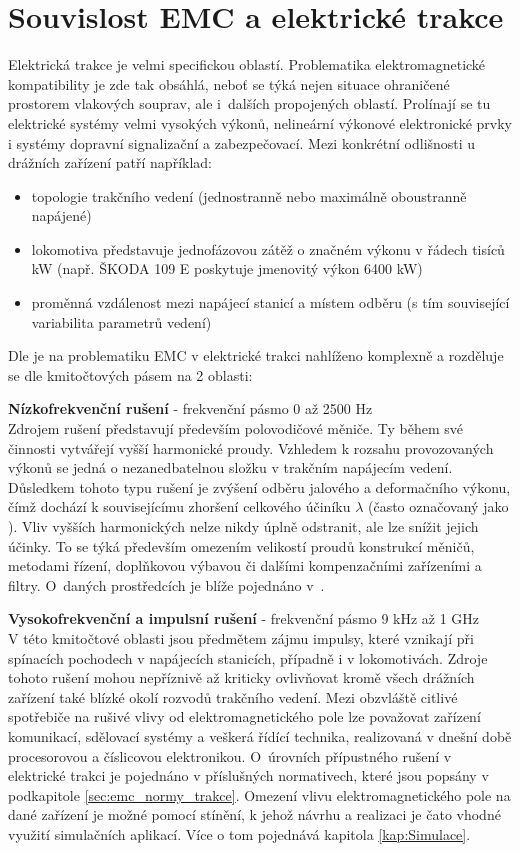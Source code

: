 \section{Souvislost EMC a elektrické trakce} \label{sec:emc_trakce}
Elektrická trakce je velmi specifickou oblastí. Problematika elektromagnetické kompatibility je zde tak obsáhlá, neboť se týká nejen situace ohraničené prostorem vlakových souprav, ale i~dalších propojených oblastí. Prolínají se tu elektrické systémy velmi vysokých výkonů, nelineární výkonové elektronické prvky i systémy dopravní signalizační a zabezpečovací. Mezi konkrétní odlišnosti u drážních zařízení patří například:
\begin{itemize}
\item topologie trakčního vedení (jednostranně nebo maximálně oboustranně napájené)
\item lokomotiva představuje jednofázovou zátěž o značném výkonu v řádech tisíců kW (např. ŠKODA 109 E poskytuje jmenovitý výkon 6400 kW)
\item proměnná vzdálenost mezi napájecí stanicí a místem odběru (s tím související variabilita parametrů vedení)
\end{itemize}
Dle \cite{emc_trakce} je na problematiku EMC v elektrické trakci nahlíženo komplexně a rozděluje se dle kmitočtových pásem na 2 oblasti:

\medskip
{\bf Nízkofrekvenční rušení} - frekvenční pásmo 0 až 2500 Hz \\
Zdrojem rušení představují především polovodičové měniče. Ty během své činnosti vytvářejí vyšší harmonické proudy. Vzhledem k rozsahu provozovaných výkonů se jedná o nezanedbatelnou složku v trakčním napájecím vedení. Důsledkem tohoto typu rušení je zvýšení odběru jalového a deformačního výkonu, čímž dochází k souvisejícímu zhoršení celkového účiníku $\lambda$ (často označovaný jako ). Vliv vyšších harmonických nelze nikdy úplně odstranit, ale lze snížit jejich účinky. To se týká především omezením velikostí proudů konstrukcí měničů, metodami řízení, doplňkovou výbavou či dalšími kompenzačními zařízeními a filtry. O~daných prostředcích je blíže pojednáno v~\cite{nfr}.

\medskip
{\bf Vysokofrekvenční a impulsní rušení} - frekvenční pásmo 9 kHz až 1 GHz \\
V této kmitočtové oblasti jsou předmětem zájmu impulsy, které vznikají při spínacích pochodech v napájecích stanicích, případně i v lokomotivách. Zdroje tohoto rušení mohou nepříznivě až kriticky ovlivňovat kromě všech drážních zařízení také blízké okolí rozvodů trakčního vedení. Mezi obzvláště citlivé spotřebiče na rušivé vlivy od elektromagnetického pole lze považovat zařízení komunikací, sdělovací systémy a veškerá řídící technika, realizovaná v dnešní době procesorovou a číslicovou elektronikou. O~úrovních přípustného rušení v elektrické trakci je pojednáno v příslušných normativech, které jsou popsány v podkapitole \ref{sec:emc_normy_trakce}. Omezení vlivu elektromagnetického pole na dané zařízení je možné pomocí stínění, k jehož návrhu a realizaci je čato vhodné využití simulačních aplikací. Více o tom pojednává kapitola \ref{kap:Simulace}.
\newpage
